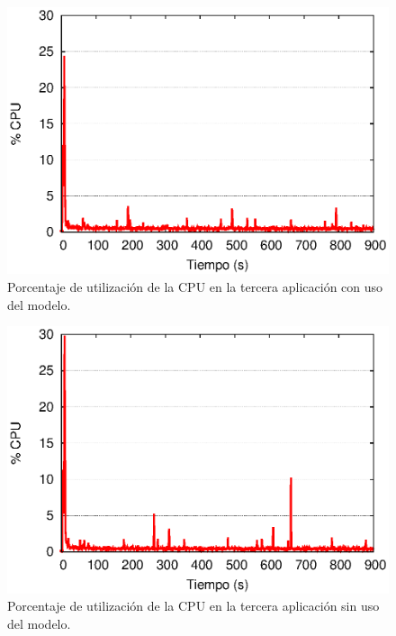 \begin{figure}[!ht]
\centering
    \includegraphics[scale=0.75]{images/exp/app3/cm/fisical/consumeCPU.eps}
    \caption{Porcentaje de utilización de la CPU en la tercera aplicación con uso del modelo.}
    \label{fig:app3-consumeCPU-cm}
\end{figure}

\begin{figure}[!ht]
\centering
    \includegraphics[scale=0.75]{images/exp/app3/sm/fisical/consumeCPU.eps}
    \caption{Porcentaje de utilización de la CPU en la tercera aplicación sin uso del modelo.}
    \label{fig:app3-consumeCPU-sm}
\end{figure}


